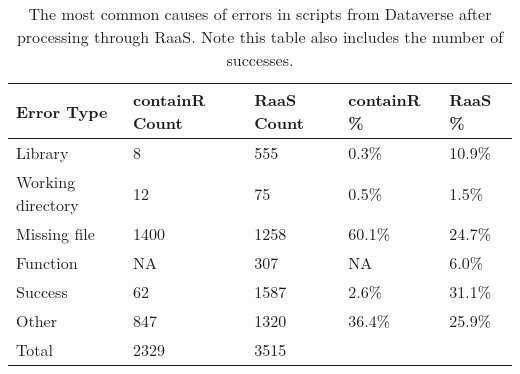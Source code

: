 \begin{table}
\centering
\caption{The most common causes of errors in scripts from Dataverse after processing through RaaS. Note this table also includes the number of successes.}
\label{tab:raas-error-data}
\begin{tabular}{lllll}
\toprule
       Error Type & containR Count & RaaS Count & containR \% & RaaS \% \\
\midrule
          Library &              8 &        555 &       0.3\% &  10.9\% \\ \hline
Working directory &             12 &         75 &       0.5\% &   1.5\% \\ \hline
     Missing file &           1400 &       1258 &      60.1\% &  24.7\% \\ \hline
         Function &             NA &        307 &         NA &   6.0\% \\ \hline
          Success &             62 &       1587 &       2.6\% &  31.1\% \\ \hline
            Other &            847 &       1320 &      36.4\% &  25.9\% \\ \hline
            Total &           2329 &       3515 &            &        \\
\bottomrule
\end{tabular}
\end{table}
